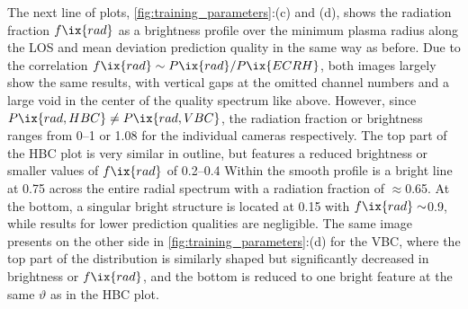             The next line of plots, \cref{fig:training_parameters}:(c) and (d), shows the radiation fraction $f\ix{rad}$ as a brightness profile over the minimum plasma radius along the LOS and mean deviation prediction quality in the same way as before. Due to the correlation $f\ix{rad}\sim P\ix{rad}/P\ix{ECRH}$, both images largely show the same results, with vertical gaps at the omitted channel numbers and a large void in the center of the quality spectrum like above. However, since $P\ix{rad,HBC}\neq P\ix{rad,VBC}$, the radiation fraction or brightness ranges from \SIrange{0}{1}{\arbitraryunit} or \SI{1.08}{\arbitraryunit} for the individual cameras respectively. The top part of the HBC plot is very similar in outline, but features a reduced brightness or smaller values of $f\ix{rad}$ of \SIrange{0.2}{0.4}{\arbitraryunit} Within the smooth profile is a bright line at \SI{0.75}{\arbitraryunit} across the entire radial spectrum with a radiation fraction of $\approx$\SI{0.65}{\arbitraryunit}. At the bottom, a singular bright structure is located at \SI{0.15}{\arbitraryunit} with $f\ix{rad}\sim$\SI{0.9}{\arbitraryunit}, while results for lower prediction qualities are negligible. The same image presents on the other side in \cref{fig:training_parameters}:(d) for the VBC, where the top part of the distribution is similarly shaped but significantly decreased in brightness or $f\ix{rad}$, and the bottom is reduced to one bright feature at the same $\vartheta$ as in the HBC plot.\\%
